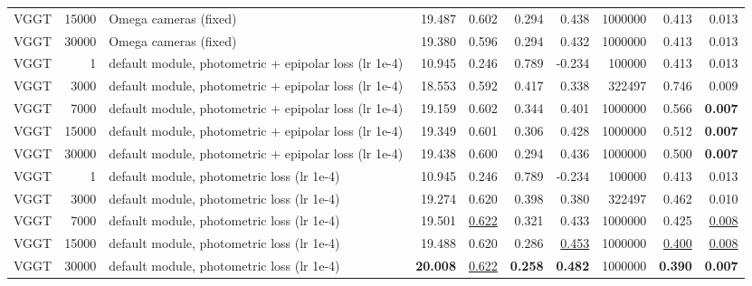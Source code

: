 \begin{table}[H]
\begin{tabular}{lrlrrrrrrr}
VGGT & 15000 & Omega cameras (fixed) & 19.487 & 0.602 & 0.294 & 0.438 & 1000000 & 0.413 & 0.013 \\
VGGT & 30000 & Omega cameras (fixed) & 19.380 & 0.596 & 0.294 & 0.432 & 1000000 & 0.413 & 0.013 \\
VGGT & 1 & default module, photometric + epipolar loss (lr 1e-4) & 10.945 & 0.246 & 0.789 & -0.234 & 100000 & 0.413 & 0.013 \\
VGGT & 3000 & default module, photometric + epipolar loss (lr 1e-4) & 18.553 & 0.592 & 0.417 & 0.338 & 322497 & 0.746 & 0.009 \\
VGGT & 7000 & default module, photometric + epipolar loss (lr 1e-4) & 19.159 & 0.602 & 0.344 & 0.401 & 1000000 & 0.566 & \textbf{0.007} \\
VGGT & 15000 & default module, photometric + epipolar loss (lr 1e-4) & 19.349 & 0.601 & 0.306 & 0.428 & 1000000 & 0.512 & \textbf{0.007} \\
VGGT & 30000 & default module, photometric + epipolar loss (lr 1e-4) & 19.438 & 0.600 & 0.294 & 0.436 & 1000000 & 0.500 & \textbf{0.007} \\
VGGT & 1 & default module, photometric loss (lr 1e-4) & 10.945 & 0.246 & 0.789 & -0.234 & 100000 & 0.413 & 0.013 \\
VGGT & 3000 & default module, photometric loss (lr 1e-4) & 19.274 & 0.620 & 0.398 & 0.380 & 322497 & 0.462 & 0.010 \\
VGGT & 7000 & default module, photometric loss (lr 1e-4) & 19.501 & \underline{0.622} & 0.321 & 0.433 & 1000000 & 0.425 & \underline{0.008} \\
VGGT & 15000 & default module, photometric loss (lr 1e-4) & 19.488 & 0.620 & 0.286 & \underline{0.453} & 1000000 & \underline{0.400} & \underline{0.008} \\
VGGT & 30000 & default module, photometric loss (lr 1e-4) & \textbf{20.008} & \underline{0.622} & \textbf{0.258} & \textbf{0.482} & 1000000 & \textbf{0.390} & \textbf{0.007} \\
\bottomrule
\end{tabular}
\end{table}